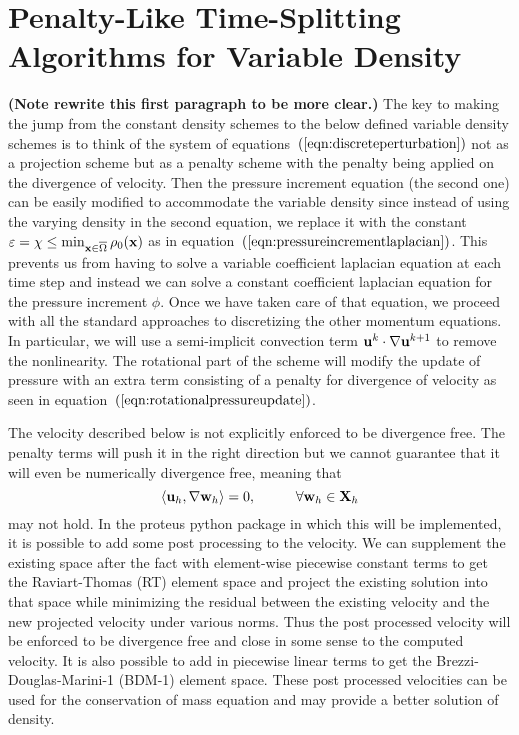 \documentclass[letterpaper]{erdc}
\begin{document}
%
%
%
%
\chapter{Penalty-Like Time-Splitting Algorithms for Variable Density}
\textbf{(Note rewrite this first paragraph to be more clear.)} The key to making the jump from the constant density schemes to the below defined variable density schemes is to think of the system of equations~$\left(\ref{eqn:discreteperturbation}\right)$ not as a projection scheme but as a penalty scheme with the penalty being applied on the divergence of velocity.  Then the pressure increment equation (the second one) can be easily modified to accommodate the variable density since instead of using the varying density in the second equation, we replace it with the constant $\varepsilon = \chi \leq \min_{\textbf{x}\in\overline{\Omega}}\rho_0(\textbf{x})$ as in equation~$\left(\ref{eqn:pressureincrementlaplacian}\right)$.  This prevents us from having to solve a variable coefficient laplacian equation at each time step and instead we can solve a constant coefficient laplacian equation for the pressure increment $\phi$.  Once we have taken care of that equation, we proceed with all the standard approaches to discretizing the other momentum equations.  In particular, we will use a semi-implicit convection term $\textbf{u}^{k}\cdot\nabla\textbf{u}^{k+1}$ to remove the nonlinearity.  The rotational part of the scheme will modify the update of pressure with an extra term consisting of a penalty for divergence of velocity as seen in equation~$\left(\ref{eqn:rotationalpressureupdate}\right)$.  

The velocity described below is not explicitly enforced to be divergence free.  The penalty terms will push it in the right direction but we cannot guarantee that it will even be numerically divergence free, meaning that 
\begin{equation}
  \left\langle \textbf{u}_h, \nabla\textbf{w}_h \right\rangle = 0, \hspace{1cm}\forall\textbf{w}_h\in\textbf{X}_h
\end{equation}
may not hold.  In the proteus python package in which this will be implemented, it is possible to add some post processing to the velocity.  We can supplement the existing space after the fact with element-wise piecewise constant terms to get the Raviart-Thomas (RT) element space and project the existing solution into that space while minimizing the residual between the existing velocity and the new projected velocity under various norms.    Thus the post processed velocity will be enforced to be divergence free and close in some sense to the computed velocity.  It is also possible to add in piecewise linear terms to get the Brezzi-Douglas-Marini-1 (BDM-1) element space.  These post processed velocities can be used for the conservation of mass equation and may provide a better solution of density.
\end{document}
